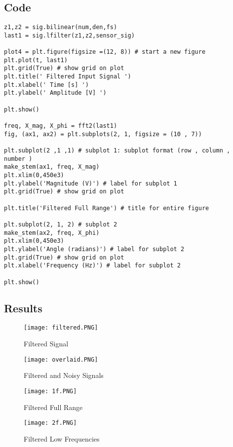 \subsection{Code}
\begin{scriptsize}
\begin{lstlisting}
z1,z2 = sig.bilinear(num,den,fs)
last1 = sig.lfilter(z1,z2,sensor_sig)

plot4 = plt.figure(figsize =(12, 8)) # start a new figure
plt.plot(t, last1)
plt.grid(True) # show grid on plot
plt.title(' Filtered Input Signal ')
plt.xlabel(' Time [s] ')
plt.ylabel(' Amplitude [V] ')

plt.show()

freq, X_mag, X_phi = fft2(last1)
fig, (ax1, ax2) = plt.subplots(2, 1, figsize = (10 , 7))

plt.subplot(2 ,1 ,1) # subplot 1: subplot format (row , column , number )
make_stem(ax1, freq, X_mag)
plt.xlim(0,450e3)
plt.ylabel('Magnitude (V)') # label for subplot 1
plt.grid(True) # show grid on plot

plt.title('Filtered Full Range') # title for entire figure 

plt.subplot(2, 1, 2) # subplot 2
make_stem(ax2, freq, X_phi)
plt.xlim(0,450e3)
plt.ylabel('Angle (radians)') # label for subplot 2
plt.grid(True) # show grid on plot
plt.xlabel('Frequency (Hz)') # label for subplot 2

plt.show()
\end{lstlisting}
\end{scriptsize}

\subsection{Results}
 \begin{figure}[H]
   \centering
   \texttt{[image: filtered.PNG]}
   \caption{Filtered Signal}
 \end{figure}
 
  \begin{figure}[H]
    \centering
    \texttt{[image: overlaid.PNG]}
    \caption{Filtered and Noisy Signals}
  \end{figure}
 
  \begin{figure}[H]
    \centering
    \texttt{[image: 1f.PNG]}
    \caption{Filtered Full Range}
  \end{figure}
 

  \begin{figure}[H]
    \centering
   \texttt{[image: 2f.PNG]}
    \caption{Filtered Low Frequencies}
  \end{figure}
  

